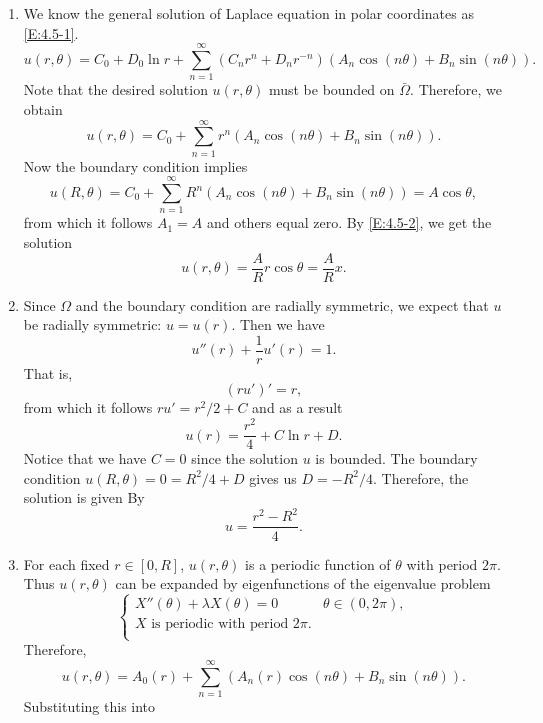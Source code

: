 \begin{enumerate}[label=(\arabic*)]
    \item We know the general solution of Laplace equation in polar coordinates as \eqref{E:4.5-1}.
        \begin{equation}\label{E:4.5-1}
            u(r,\theta) = C_0 + D_0\ln r + \sum_{n=1}^\infty(C_nr^n+D_nr^{-n})(A_n\cos(n\theta)+B_n\sin(n\theta)).
        \end{equation}
        Note that the desired solution $u(r,\theta)$ must be bounded on $\bar{\Omega}$. Therefore, we obtain
        \begin{equation}\label{E:4.5-2}
            u(r,\theta) = C_0 + \sum_{n=1}^\infty r^n(A_n\cos(n\theta)+B_n\sin(n\theta)).
        \end{equation}
        Now the boundary condition implies
        \[
            u(R,\theta) = C_0 + \sum_{n=1}^\infty R^n(A_n\cos(n\theta)+B_n\sin(n\theta)) = A\cos\theta,
        \]
        from which it follows $A_1=A$ and others equal zero. By \eqref{E:4.5-2}, we get the solution
        \[
            u(r,\theta) = \frac{A}{R}r\cos\theta = \frac{A}{R}x.
        \]
    \item Since $\Omega$ and the boundary condition are radially symmetric, we expect that $u$ be radially symmetric: $u=u(r)$. Then we have
        \[
            u''(r) + \frac{1}{r}u'(r) = 1.
        \]
        That is,
        \[
            \left(ru'\right)' = r,
        \]
        from which it follows $ru'=r^2/2+C$ and as a result
        \[
            u(r) = \frac{r^2}{4} + C\ln r + D.
        \]
        Notice that we have $C=0$ since the solution $u$ is bounded. The boundary condition $u(R,\theta)=0=R^2/4+D$ gives us $D=-R^2/4$. Therefore, the solution is given By
        \[
            u = \frac{r^2-R^2}{4}.
        \]
    \item For each fixed $r\in[0,R]$, $u(r,\theta)$ is a periodic function of $\theta$ with period $2\pi$. Thus $u(r,\theta)$ can be expanded by eigenfunctions of the eigenvalue problem
        \[
            \begin{cases}
                X''(\theta) + \lambda X(\theta) = 0 & \theta\in(0, 2\pi), \\
                X \text{ is periodic with period $2\pi$.} & \\
            \end{cases}
        \]
        Therefore,
        \[
            u(r,\theta) = A_0(r) + \sum_{n=1}^\infty (A_n(r)\cos(n\theta) + B_n\sin(n\theta)).
        \]
        Substituting this into

\end{enumerate}
